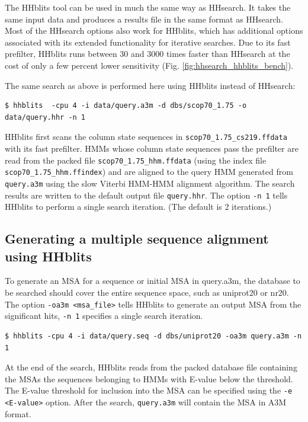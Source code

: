 \documentclass[11pt,a4paper]{article}
\begin{document}
The HHblits tool can be used in much the same way as HHsearch. 
It takes the same input data and produces a results file in the same format as HHsearch.
Most of the HHsearch options also work for HHblits, which has
additional options associated with its extended functionality for iterative searches. 
Due to its fast prefilter, HHblits runs between 30 and 3000 times faster than HHsearch
at the cost of only a few percent lower sensitivity (Fig. \ref{fig:hhsearch_hhblits_bench}).

The same search as above is performed here using HHblits instead of HHsearch:
\begin{verbatim}
$ hhblits  -cpu 4 -i data/query.a3m -d dbs/scop70_1.75 -o data/query.hhr -n 1
\end{verbatim}

HHblits first scans the column state sequences in \verb`scop70_1.75_cs219.ffdata` with its fast prefilter. HMMs whose column state sequences pass the prefilter are read from the packed file \verb`scop70_1.75_hhm.ffdata` (using the index file \verb`scop70_1.75_hhm.ffindex`) and are aligned to the query HMM generated from \verb`query.a3m` using the slow Viterbi HMM-HMM alignment algorithm. The search results are written to the default output file \verb`query.hhr`. The option \verb`-n 1` tells HHblits to perform a single search iteration. (The default is 2 iterations.)


\subsection{Generating a multiple sequence alignment using HHblits}\label{msa_hhblits}

To generate an MSA for a sequence or initial MSA in query.a3m, the database to be searched should cover the entire sequence space, such as uniprot20 or nr20. The option \verb`-oa3m <msa_file>` tells HHblits to generate an output MSA from the significant hits, \verb`-n 1` specifies a single search iteration.
\begin{verbatim}
$ hhblits -cpu 4 -i data/query.seq -d dbs/uniprot20 -oa3m query.a3m -n 1
\end{verbatim}

At the end of the search, HHblits reads from the packed database file containing the MSAs the sequences belonging to HMMs with E-value below the threshold. The E-value threshold for inclusion into the MSA can be specified using the \verb`-e <E-value>` option. After the search, \verb`query.a3m` will contain the MSA in A3M format.
\end{document}
